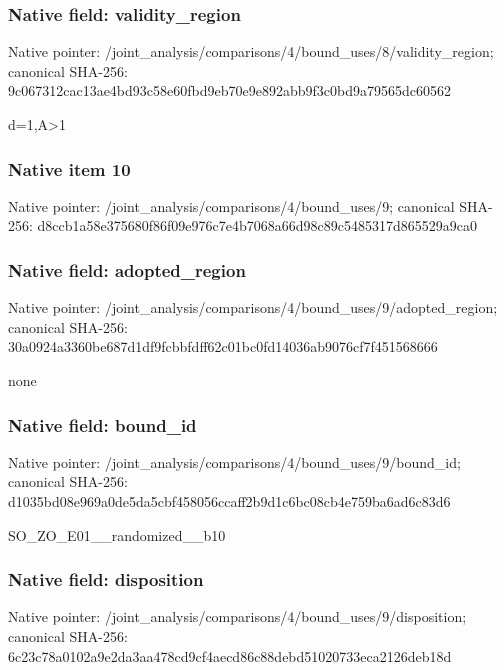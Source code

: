 \documentclass[10pt,a4paper]{article}
\begin{document}
\subsubsection{Native field: validity\_\allowbreak{}region}
Native pointer: /joint\_\allowbreak{}analysis/comparisons/4/bound\_\allowbreak{}uses/8/validity\_\allowbreak{}region; canonical SHA-256: 9c067312cac13ae4bd93c58e60fbd9eb70e9e892abb9f3c0bd9a79565dc60562

\begingroup\raggedright\sloppy d=\allowbreak{}1,\allowbreak{}A>1\par\endgroup

\subsubsection{Native item 10}
Native pointer: /joint\_\allowbreak{}analysis/comparisons/4/bound\_\allowbreak{}uses/9; canonical SHA-256: d8ccb1a58e375680f86f09e976c7e4b7068a66d98c89c5485317d865529a9ca0

\subsubsection{Native field: adopted\_\allowbreak{}region}
Native pointer: /joint\_\allowbreak{}analysis/comparisons/4/bound\_\allowbreak{}uses/9/adopted\_\allowbreak{}region; canonical SHA-256: 30a0924a3360be687d1df9fcbbfdff62c01bc0fd14036ab9076cf7f451568666

\begingroup\raggedright\sloppy none\par\endgroup

\subsubsection{Native field: bound\_\allowbreak{}id}
Native pointer: /joint\_\allowbreak{}analysis/comparisons/4/bound\_\allowbreak{}uses/9/bound\_\allowbreak{}id; canonical SHA-256: d1035bd08e969a0de5da5cbf458056ccaff2b9d1c6bc08cb4e759ba6ad6c83d6

\begingroup\raggedright\sloppy SO\_\allowbreak{}ZO\_\allowbreak{}E01\_\allowbreak{}\_\allowbreak{}randomized\_\allowbreak{}\_\allowbreak{}b10\par\endgroup

\subsubsection{Native field: disposition}
Native pointer: /joint\_\allowbreak{}analysis/comparisons/4/bound\_\allowbreak{}uses/9/disposition; canonical SHA-256: 6c23c78a0102a9e2da3aa478cd9cf4aecd86c88debd51020733eca2126deb18d
\end{document}
